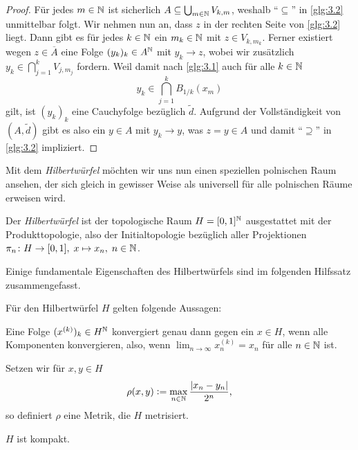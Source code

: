 \documentclass[../thesis/thesis.tex]{subfiles}
\begin{document}
\begin{proof}
		Für jedes $m \in \mathbb{N}$ ist sicherlich $A \subseteq 
		\bigcup_{m \in \mathbb{N}} V_{k, m}$, weshalb \enquote{$\subseteq$} 
		in \eqref{glg:3.2} unmittelbar folgt.
		Wir nehmen nun an, dass $z$ in der rechten Seite von \eqref{glg:3.2} liegt. 
		Dann gibt es für jedes $k \in \mathbb{N}$ ein $m_k \in \mathbb{N}$ mit $z \in V_{k, m_k}$. 
		Ferner existiert wegen $z \in \overline{A}$ eine Folge $(y_k)_k \in A^{\mathbb{N}}$ 
		mit $y_k \to z$, wobei wir zusätzlich
		$y_k \in \bigcap_{j=1}^{k} V_{j, m_j}$
		fordern. Weil damit nach \eqref{glg:3.1} auch für alle $k \in \mathbb{N}$
		\[y_k \in \bigcap_{j=1}^{k} B_{1/k}(x_m)\]
		gilt, ist $(y_k)_k$ eine Cauchyfolge bezüglich $\tilde{d}$. Aufgrund der Vollständigkeit von 
		$(A, \tilde{d})$ gibt es also ein $y \in A$ mit $y_k \to y$, was 
		$z = y \in A$ und damit \enquote{$\supseteq$} 
		in \eqref{glg:3.2} impliziert.
	\end{proof}
	
	Mit dem \emph{Hilbertwürfel} möchten wir uns nun einen speziellen polnischen Raum ansehen, 
	der sich gleich in gewisser Weise als universell für alle polnischen Räume erweisen wird.
	
	\begin{Definition}[Hilbertwürfel]
		Der \emph{Hilbertwürfel} ist der topologische Raum $H = [0, 1]^{\mathbb{N}}$ 
		ausgestattet mit der Produkttopologie, also der Initialtopologie bezüglich 
		aller Projektionen $\pi_n \colon H \to [0, 1], \; x \mapsto x_n , \; n \in \mathbb{N}$.
	\end{Definition}
	
	Einige fundamentale Eigenschaften des Hilbertwürfels sind im folgenden Hilfssatz zusammengefasst.
	
	\begin{Hilfssatz}
		\label{hilfssatz:hilbertwürfel}
		Für den Hilbertwürfel $H$ gelten folgende Aussagen:
		\begin{enumeratethm}
			\item Eine Folge $(x^{(k)})_k \in H^{\mathbb{N}}$ konvergiert genau dann gegen 
			ein $x \in H$, wenn alle Komponenten konvergieren, also, wenn
			$\lim_{n \to \infty} x_n^{(k)} = x_n$ für alle $n \in \mathbb{N}$ ist.
			\item Setzen wir für $x, y \in H$
			$$\rho(x, y) \vcentcolon = \max_{n \in \mathbb{N}} \frac{|x_n - y_n|}{2^n} \text{,}$$
			so definiert $\rho$ eine Metrik, die $H$ metrisiert.
			\item $H$ ist kompakt.
		\end{enumeratethm}
	\end{Hilfssatz}
	
\end{document}

